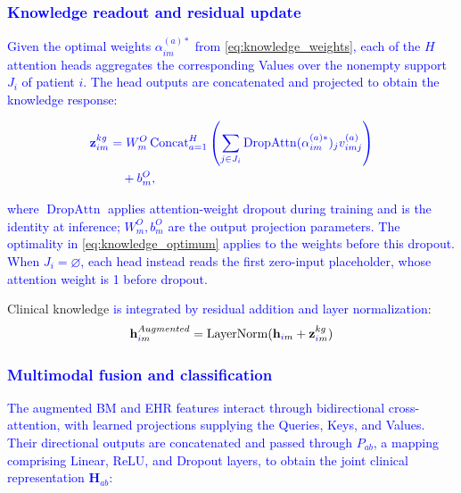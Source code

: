 \documentclass[lettersize,journal]{IEEEtran}
\begin{document}
\subsubsection{\textcolor{blue}{Knowledge readout and residual update}}

    \textcolor{blue}{Given the optimal weights $\alpha_{im}^{(a)*}$ from \cref{eq:knowledge_weights}, each of the $H$ attention heads aggregates the corresponding Values over the nonempty support $J_i$ of patient $i$. The head outputs are concatenated and projected to obtain the knowledge response:}

    \begin{equation}
        {\color{blue}
        \begin{aligned}
        \mathbf{z}_{im}^{kg}&=W_m^O\operatorname{Concat}_{a=1}^{H}\left(
        \sum_{j\in J_i}\operatorname{DropAttn}
        (\alpha_{im}^{(a)*})_j v_{imj}^{(a)}\right)\\
        &\quad+b_m^O,
        \end{aligned}
        }
        \label{eq:knowledge_response}
    \end{equation}

    \textcolor{blue}{where $\operatorname{DropAttn}$ applies attention-weight dropout during training and is the identity at inference; $W_m^O,b_m^O$ are the output projection parameters. The optimality in \cref{eq:knowledge_optimum} applies to the weights before this dropout.}
    \textcolor{blue}{When $J_i=\varnothing$, each head instead reads the first zero-input placeholder, whose attention weight is 1 before dropout.}

    Clinical knowledge \textcolor{blue}{is integrated by residual addition and layer normalization}:
    \begin{equation}
    \mathbf{h}_{\textcolor{blue}{i}m}^{Augmented} = \mathrm{LayerNorm}(\mathbf{h}_{\textcolor{blue}{i}m} + \mathbf{z}_{\textcolor{blue}{i}m}^{kg})
    \end{equation}

\subsubsection{\textcolor{blue}{Multimodal fusion and classification}}

    \textcolor{blue}{The augmented BM and EHR features interact through bidirectional cross-attention, with learned projections supplying the Queries, Keys, and Values. Their directional outputs are concatenated and passed through $P_{ab}$, a mapping comprising Linear, ReLU, and Dropout layers, to obtain the joint clinical representation $\mathbf{H}_{ab}$:}
\end{document}
